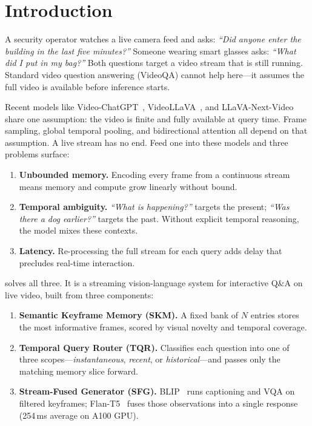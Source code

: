 \section{Introduction}
\label{sec:intro}

A security operator watches a live camera feed and asks: \emph{``Did anyone enter the building in the last five minutes?''}
Someone wearing smart glasses asks: \emph{``What did I put in my bag?''}
Both questions target a video stream that is still running. Standard video question answering (VideoQA) cannot help here---it assumes the full video is available before inference starts.

Recent models like Video-ChatGPT~\cite{maaz2023videochatgpt}, VideoLLaVA~\cite{lin2023videollava}, and LLaVA-Next-Video~\cite{zhang2024llavanextvideo} share one assumption: the video is finite and fully available at query time.
Frame sampling, global temporal pooling, and bidirectional attention all depend on that assumption.
A live stream has no end. Feed one into these models and three problems surface:

\begin{enumerate}[leftmargin=*,itemsep=2pt]
    \item \textbf{Unbounded memory.} Encoding every frame from a continuous stream means memory and compute grow linearly without bound.
    \item \textbf{Temporal ambiguity.} \emph{``What is happening?''} targets the present; \emph{``Was there a dog earlier?''} targets the past. Without explicit temporal reasoning, the model mixes these contexts.
    \item \textbf{Latency.} Re-processing the full stream for each query adds delay that precludes real-time interaction.
\end{enumerate}

\textbf{\ours} solves all three. It is a streaming vision-language system for interactive Q\&A on live video, built from three components:

\begin{enumerate}[leftmargin=*,itemsep=2pt]
    \item \textbf{Semantic Keyframe Memory (SKM).}
    A fixed bank of $N$ entries stores the most informative frames, scored by visual novelty and temporal coverage.

    \item \textbf{Temporal Query Router (TQR).}
    Classifies each question into one of three scopes---\emph{instantaneous}, \emph{recent}, or \emph{historical}---and passes only the matching memory slice forward.

    \item \textbf{Stream-Fused Generator (SFG).}
    BLIP~\cite{li2022blip} runs captioning and VQA on filtered keyframes; Flan-T5~\cite{chung2022flanT5} fuses those observations into a single response (254\,ms average on A100 GPU).
\end{enumerate}

